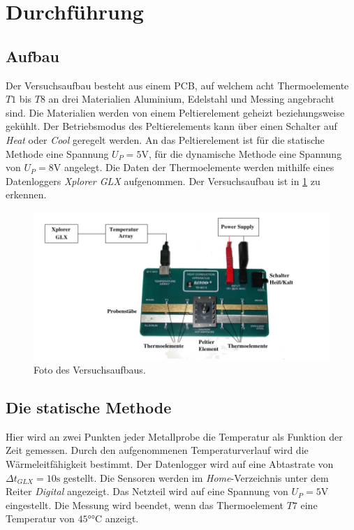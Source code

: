 \section{Durchführung}
\label{sec:durchführung}

\subsection{Aufbau}
\label{sec:aufbau}
Der Versuchsaufbau besteht aus einem PCB, auf welchem acht Thermoelemente $T1$ bis
$T8$ an drei Materialien Aluminium, Edelstahl und Messing angebracht sind. Die
Materialien werden von einem Peltierelement geheizt beziehungsweise gekühlt.
Der Betriebsmodus des Peltierelements kann über einen Schalter auf \textit{Heat}
oder \textit{Cool} geregelt werden. An das Peltierelement ist für die statische
Methode eine Spannung $U_P = 5 \si{\volt}$, für die dynamische Methode eine
Spannung von $U_P = 8 \si{\volt}$ angelegt. Die Daten der Thermoelemente werden
mithilfe eines Datenloggers \textit{Xplorer GLX} aufgenommen.
Der Versuchsaufbau ist in \ref{fig:aufbau} zu erkennen.

\begin{figure}[H]
  \centering
  \includegraphics[scale=0.5]{pcb.png}
  \caption{Foto des Versuchsaufbaus.}
  \label{fig:aufbau}
\end{figure}

\subsection{Die statische Methode}
\label{sec:statisch}
Hier wird an zwei Punkten jeder Metallprobe die Temperatur als Funktion der Zeit
gemessen. Durch den aufgenommenen Temperaturverlauf wird die Wärmeleitfähigkeit bestimmt.
Der Datenlogger wird auf eine Abtastrate von $\Delta t_{GLX} = 10 \si{\second}$
gestellt. Die Sensoren werden im \textit{Home}-Verzeichnis unter dem Reiter \textit{Digital}
angezeigt. Das Netzteil wird auf eine Spannung von $U_P = 5 \si{\volt}$ eingestellt.
Die Messung wird beendet, wenn das Thermoelement $T7$ eine Temperatur von $45 \si{\degree\celsius}$
anzeigt.

